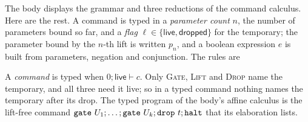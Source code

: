 \documentclass[acmsmall,screen,review,anonymous,nonacm]{acmart}
\begin{document}
The body displays the grammar and three reductions of the command calculus.
Here are the rest. A command is typed in a \emph{parameter count} $n$, the
number of parameters bound so far, and a \emph{flag} $\ell \in
\{\mathsf{live}, \mathsf{dropped}\}$ for the temporary; the parameter bound by
the $n$-th lift is written $p_n$, and a boolean expression $e$ is built from
parameters, negation and conjunction. The rules are
A \emph{command} is typed when $0;\mathsf{live} \vdash c$. Only
\textsc{Gate}, \textsc{Lift} and \textsc{Drop} name the temporary, and all
three need it live; so in a typed command nothing names the temporary after
its drop. The typed program of the body's affine calculus is the lift-free
command $\texttt{gate}\ U_1; \ldots; \texttt{gate}\ U_k; \texttt{drop}\ t; \texttt{halt}$
that its elaboration lists.
\end{document}
